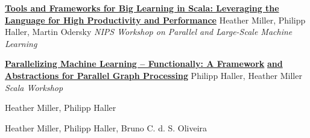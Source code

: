 \documentclass[9pt]{article}
\begin{document}
\noindent\href{http://infoscience.epfl.ch/record/170032}{\bf Tools and Frameworks for Big Learning in Scala: Leveraging the}\vspace{-0.03in}
\newline\noindent\href{http://infoscience.epfl.ch/record/170032}{\bf Language for High Productivity and Performance}
\newline\noindent Heather Miller, Philipp Haller, Martin Odersky
\newline\noindent\emph{NIPS Workshop on Parallel and Large-Scale Machine Learning}
\bigskip

\noindent\href{http://infoscience.epfl.ch/record/165111}{\bf Parallelizing Machine Learning -- Functionally: A Framework}\vspace{-0.03in}
\newline\noindent\href{http://infoscience.epfl.ch/record/165111}{\bf and Abstractions for Parallel Graph Processing}
\newline\noindent Philipp Haller, Heather Miller
\newline\noindent\emph{Scala Workshop}
\bigskip


\medskip


\dates{}
\newline\noindent Heather Miller, Philipp Haller
\medskip

\dates{}
\newline\noindent Heather Miller, Philipp Haller, Bruno C. d. S. Oliveira
\medskip
\end{document}
